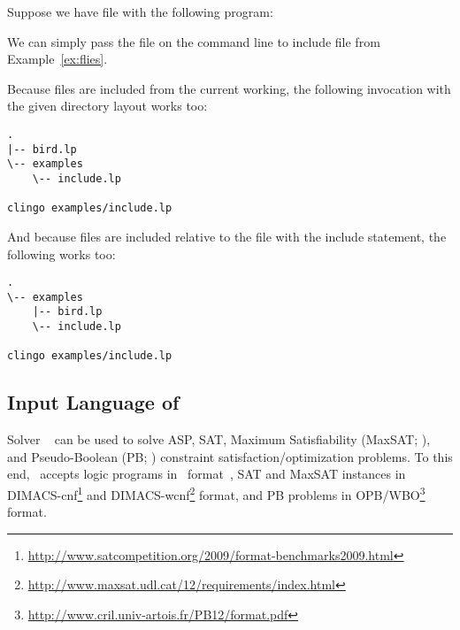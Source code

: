 \begin{example}
Suppose we have file  with the following program:
%

%
%
%
We can simply pass the file on the command line
to include file  from Example~\ref{ex:flies}.

Because files are included from the current working,
the following invocation with the given directory layout works too:
\begin{lstlisting}[numbers=none]
.
|-- bird.lp
\-- examples
    \-- include.lp

clingo examples/include.lp
\end{lstlisting}

And because files are included relative to the file with the include statement,
the following works too:
\begin{lstlisting}[numbers=none]
.
\-- examples
    |-- bird.lp
    \-- include.lp

clingo examples/include.lp
\end{lstlisting}
\eexample
\end{example}

\subsection{Input Language of \clasp}\label{subsec:lang:clasp}

Solver \clasp~\cite{gekanesc07b} can be used to solve ASP, SAT, Maximum Satisfiability (MaxSAT; \cite{liman09a}),
and Pseudo-Boolean (PB; \cite{rouman09a}) constraint satisfaction/optimization problems.
To this end, \clasp\ accepts logic programs in \smodels\ format~\cite{lparseManual},
SAT and MaxSAT instances in DIMACS-cnf\footnote{\url{http://www.satcompetition.org/2009/format-benchmarks2009.html}}
and DIMACS-wcnf\footnote{\url{http://www.maxsat.udl.cat/12/requirements/index.html}} format,
and PB problems in OPB/WBO\footnote{\url{http://www.cril.univ-artois.fr/PB12/format.pdf}} format.

